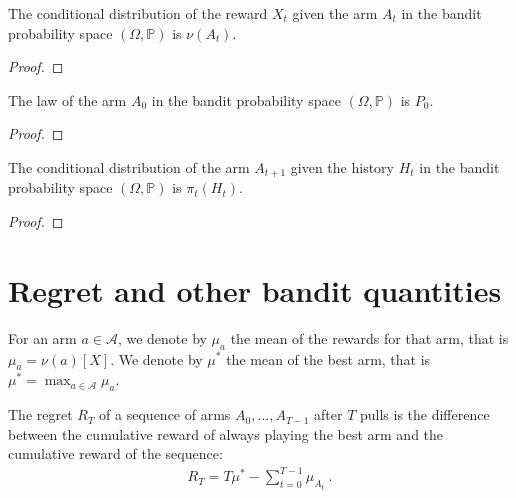 \begin{lemma}\label{lem:condDistrib_reward}
  \leanok
The conditional distribution of the reward $X_t$ given the arm $A_t$ in the bandit probability space $(\Omega, \mathbb{P})$ is $\nu(A_t)$.
\end{lemma}

\begin{proof}

\end{proof}


\begin{lemma}\label{lem:law_arm_zero}
The law of the arm $A_0$ in the bandit probability space $(\Omega, \mathbb{P})$ is $P_0$.
\end{lemma}

\begin{proof}

\end{proof}


\begin{lemma}\label{lem:condDistrib_arm}
  \leanok
The conditional distribution of the arm $A_{t+1}$ given the history $H_t$ in the bandit probability space $(\Omega, \mathbb{P})$ is $\pi_t(H_t)$.
\end{lemma}

\begin{proof}

\end{proof}


\section{Regret and other bandit quantities}

\begin{definition}\label{def:armMean}
  \leanok %
For an arm $a \in \mathcal{A}$, we denote by $\mu_a$ the mean of the rewards for that arm, that is $\mu_a = \nu(a)[X]$.
We denote by $\mu^*$ the mean of the best arm, that is $\mu^* = \max_{a \in \mathcal{A}} \mu_a$.
\end{definition}


\begin{definition}[Regret]\label{def:regret}
  \leanok
The regret $R_T$ of a sequence of arms $A_0, \ldots, A_{T-1}$ after $T$ pulls is the difference between the cumulative reward of always playing the best arm and the cumulative reward of the sequence:
\begin{align*}
  R_T = T \mu^* - \sum_{t=0}^{T-1} \mu_{A_t} \: .
\end{align*}
\end{definition}


